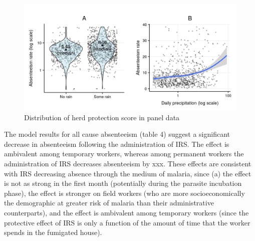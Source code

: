 \documentclass[]{article}
\begin{document}
\begin{figure}[!h]

{\centering \includegraphics{figures/unnamed-chunk-28-1} 

}

\caption{Distribution of herd protection score in panel data}\label{fig:unnamed-chunk-28}
\end{figure}

The model results for all cause absenteeism (table 4) suggest a
significant decrease in absenteeism following the administration of IRS.
The effect is ambivalent among temporary workers, whereas among
permanent workers the administration of IRS decreases absenteeism by
xxx. These effects are consistent with IRS decreasing absence through
the medium of malaria, since (a) the effect is not as strong in the
first month (potentially during the parasite incubation phase), the
effect is stronger on field workers (who are more socioeconomically the
demographic at greater risk of malaria than their administrative
counterparts), and the effect is ambivalent among temporary workers
(since the protective effect of IRS is only a function of the amount of
time that the worker spends in the fumigated house).
\end{document}
